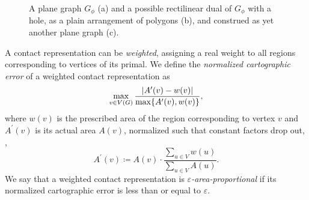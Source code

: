 \begin{figure}[H]
	\centering
	\quad
	\quad
	\caption{A plane graph $G_\phi$ (a) and a possible rectilinear dual of $G_\phi$ with a hole, as a plain arrangement of polygons (b), and construed as yet another plane graph (c).}
	\label{fig:preliminaries-rectilinear-dual}
\end{figure}

A contact representation can be \emph{weighted}, assigning a real weight to all regions corresponding to vertices of its primal.
We define the \emph{normalized cartographic error} \cite{alam2015quantitative} of a weighted contact representation as
%
\begin{equation*}
    \max\limits_{v \in V(G)} \frac{\left\lvert A^\prime(v) - w(v)\right\rvert}{\max\{A^\prime(v),w(v)\}},
\end{equation*}
%
where $w(v)$ is the prescribed area of the region corresponding to vertex $v$ and $A^\prime(v)$ is its actual area $A(v)$, normalized such that constant factors drop out, \ie{},
%
\begin{equation*}
	A^\prime(v) \coloneqq A(v) \cdot \frac{\sum\limits_{u \in V}{w(u)}}{\sum\limits_{u \in V}{A(u)}}.
\end{equation*}
%
We say that a weighted contact representation is \emph{$\varepsilon$-area-proportional} if its normalized cartographic error is less than or equal to $\varepsilon$.



